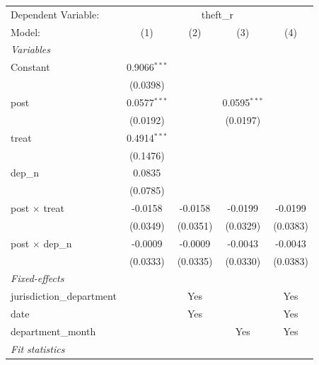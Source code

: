 \begingroup
\centering
\begin{tabular}{lcccc}
   \tabularnewline \midrule \midrule
   Dependent Variable: & \multicolumn{4}{c}{theft\_r}\\
   Model:                    & (1)            & (2)                   & (3)            & (4)\\  
   \midrule
   \emph{Variables}\\
   Constant                  & 0.9066$^{***}$ &                       &                &   \\   
                             & (0.0398)       &                       &                &   \\   
   post                      & 0.0577$^{***}$ &                       & 0.0595$^{***}$ &   \\   
                             & (0.0192)       &                       & (0.0197)       &   \\   
   treat                     & 0.4914$^{***}$ &                       &                &   \\   
                             & (0.1476)       &                       &                &   \\   
   dep\_n                    & 0.0835         &                       &                &   \\   
                             & (0.0785)       &                       &                &   \\   
   post $\times$ treat       & -0.0158        & -0.0158               & -0.0199        & -0.0199\\   
                             & (0.0349)       & (0.0351)              & (0.0329)       & (0.0383)\\   
   post $\times$ dep\_n      & -0.0009        & -0.0009               & -0.0043        & -0.0043\\   
                             & (0.0333)       & (0.0335)              & (0.0330)       & (0.0383)\\   
   \midrule
   \emph{Fixed-effects}\\
   jurisdiction\_department  &                & Yes                   &                & Yes\\  
   date                      &                & Yes                   &                & Yes\\  
   department\_month         &                &                       & Yes            & Yes\\  
   \midrule
   \emph{Fit statistics}\\

\end{tabular}

